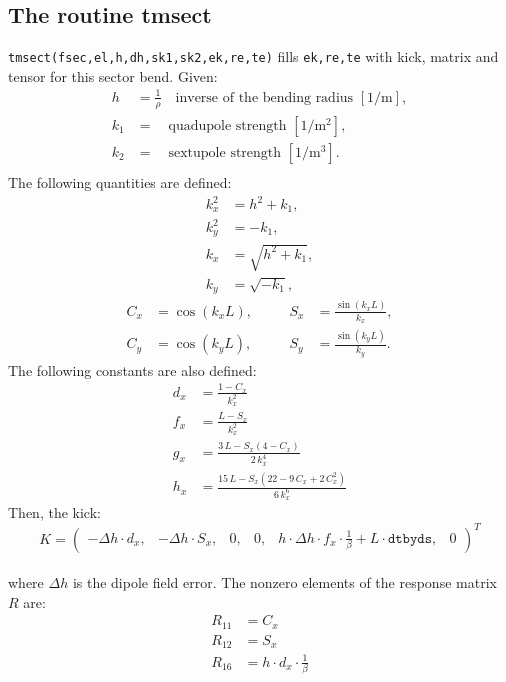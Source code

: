 \documentclass{cern-art} %
\renewcommand{\L}[1]{\lstinline[firstnumber=last]{#1}}
\begin{document}
\subsection{The routine {tmsect}}
\L{tmsect(fsec,el,h,dh,sk1,sk2,ek,re,te)} fills \L{ek,re,te} with kick, matrix and tensor for this sector bend.
Given:
\[
\begin{aligned}
h & =\frac{1}{\rho}\quad\text{inverse of the bending radius }\mathrm{[1/m]},\\
k_{1} & =\quad\text{quadupole strength }\mathrm{[1/m^{2}]},\\
k_{2} & =\quad\text{sextupole strength }\mathrm{[1/m^{3}]}.\\
\end{aligned}
\]
The following quantities are defined:
\[
\begin{aligned}
k_{x}^2 & ={h^{2}+k_{1}},\\
k_{y}^2 & =-k_{1},\\
k_{x} & =\sqrt{h^{2}+k_{1}},\\
k_{y} & =\sqrt{-k_{1}},
\end{aligned}
\]
\[
\begin{aligned}C_{x} & =\cos(k_{x}L), & \quad & S_{x} & =\frac{\sin(k_{x}L)}{k_{x}},\\
C_{y} & =\cos(k_{y}L), & \quad & S_{y} & =\frac{\sin(k_{y}L)}{k_{y}}.
\end{aligned}
\]
The following constants are also defined:
\[
\begin{aligned}d_{x} & =\frac{1-C_{x}}{k_{x}^{2}}\\
f_{x} & =\frac{L-S_{x}}{k_{x}^{2}}\\
g_{x} & =\frac{3\, L-S_{x}\left(4-C_{x}\right)}{2\, k_{x}^{4}}\\
h_{x} & =\frac{15\, L-S_{x}\left(22-9\, C_{x}+2\, C_{x}^{2}\right)}{6\, k_{x}^{6}}
\end{aligned}
\]
Then, the kick:
\[
K=\left(\begin{array}{cccccc}
-\Delta h\cdot d_{x}, & -\Delta h\cdot S_{x}, & 0, & 0, &  h{\cdot}{\Delta h}{\cdot}{f_x}{\cdot} {\frac 1 \beta} + L{\cdot}\texttt{dtbyds}, & 0\end{array}\right)^{T}
\]
\\where $\Delta h$ is the dipole field error. The nonzero elements of the response matrix $R$ are:
\[
\begin{array}{rl}
  R_{11} &= {C_x}\\
  R_{12} &= {S_x}\\
  R_{16} &= h {\cdot} {d_x} {\cdot} {\frac 1 \beta}\\
\end{array}
\]
\end{document}
